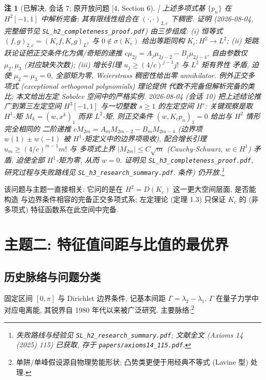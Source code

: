 \documentclass[UTF8]{ctexart}
\newtheorem{remark}[theorem]{注}
\begin{document}
\begin{remark}[已解决, 会话 7; 原开放问题 [4, Section 6]]
上述多项式基 $\{p_n\}$ 在 $H^2[-1,1]$ 中\emph{解析完备}: 其有限线性组合在
$(\cdot, \cdot)_{2,c}$ 下稠密. 证明 (2026-08-04, 完整细节见
\texttt{SL\_h2\_completeness\_proof.pdf}) 由三步组成: (i) 恒等式
$(f,g)_{2,c} = (K_c f, K_c g)_{L^2}$ 与 $0 \notin \sigma(K_c)$ 给出等距同构
$K_c: H^2 \to L^2$; (ii) 矩跳跃论证把正交条件化为偶/奇矩的递推
$c\mu_{2j} = A_j\mu_{2j-2} - B_j\mu_{2j-4}$, 自由参数仅 $\mu_2, \mu_3$
(对应缺失次数); (iii) 增长引理 $u_j \geq (4/c)^{j-1}j!$ 与 $L^2$ 矩有界性
矛盾, 迫使 $\mu_2 = \mu_3 = 0$, 全部矩为零, Weierstrass 稠密性给出零
annihilator. 例外正交多项式 (exceptional orthogonal polynomials) 理论提供
代数不完备但解析完备的类比; 本文给出左定 Sobolev 空间中的严格实例.
2026-08-04 (会话 10) 把上述结论推广到第三左定空间 $H^3[-1,1]$ 与一切整数
$s \geq 1$ 的左定空间 $H^s$: 关键观察是取 $H^1$-矩 $M_k = (w, x^k)_1$ 而非
$L^2$-矩, 则正交条件 $(w, K_c p_n)_1 = 0$ 给出与 $H^2$ 情形\emph{完全相同}的
二阶递推 $cM_{2m} = A_m M_{2m-2} - B_m M_{2m-4}$ (边界项 $w(1)\pm w(-1)$
被 $H^1$-矩定义中的边界项吸收), 配合增长引理 $u_m \geq (4/c)^{m-1}m!$ 与
多项式上界 $|M_{2m}| \leq C\sqrt m$ (Cauchy-Schwarz, $w \in H^1$) 矛盾,
迫使全部 $H^1$-矩为零, 从而 $w = 0$. 证明见
\texttt{SL\_h3\_completeness\_proof.pdf}, 研究过程与失败路线见
\texttt{SL\_h3\_research\_summary.pdf}.
条件) 仍开放.\footnote{失败路线与经验见 \texttt{SL\_h2\_research\_summary.pdf}; 文献全文 (Axioms 14 (2025) 115) 已获取, 存于 \texttt{papers/axioms14\_115.pdf}.}
\end{remark}

该问题与主题一直接相关: 它问的是在 $H^2 = D(K_c)$ 这一更大空间层面, 是否能构造
与边界条件相容的完备正交多项式系; 左定理论 (定理 1.3) 只保证 $K_c$ 的 (非多项式)
特征函数系在此空间中完备.

\section{主题二: 特征值间距与比值的最优界}

\subsection{历史脉络与问题分类}

固定区间 $[0, \pi]$ 与 Dirichlet 边界条件, 记基本间距 $\Gamma = \lambda_2 - \lambda_1$.
$\Gamma$ 在量子力学中对应电离能, 其锐界自 1980 年代以来被广泛研究. 主要脉络:\footnote{单阱/单峰假设源自物理势能形状; 凸势类更便于用经典不等式 (Lavine 型) 处理.}
\end{document}
